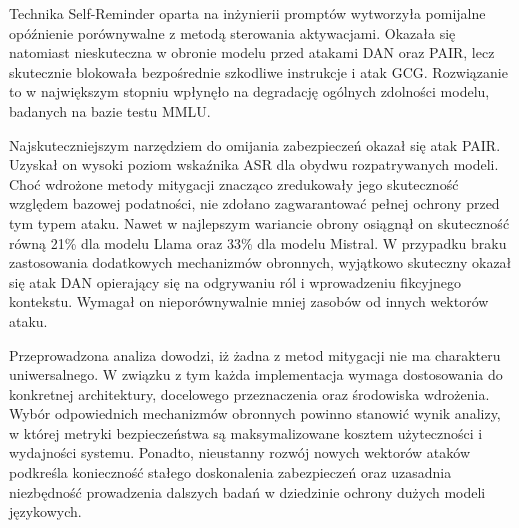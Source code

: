 Technika Self-Reminder oparta na inżynierii promptów wytworzyła pomijalne opóźnienie porównywalne z metodą sterowania aktywacjami. Okazała się natomiast nieskuteczna w obronie modelu przed atakami \gls{DAN} oraz \gls{PAIR}, lecz skutecznie blokowała bezpośrednie szkodliwe instrukcje i atak \gls{GCG}. Rozwiązanie to w największym stopniu wpłynęło na degradację ogólnych zdolności modelu, badanych na bazie testu MMLU.

Najskuteczniejszym narzędziem do omijania zabezpieczeń okazał się atak \gls{PAIR}. Uzyskał on wysoki poziom wskaźnika \gls{ASR} dla obydwu rozpatrywanych modeli. Choć wdrożone metody mitygacji znacząco zredukowały jego skuteczność względem bazowej podatności, nie zdołano zagwarantować pełnej ochrony przed tym typem ataku. Nawet w najlepszym wariancie obrony osiągnął on skuteczność równą 21\% dla modelu Llama oraz 33\% dla modelu Mistral. W przypadku braku zastosowania dodatkowych mechanizmów obronnych, wyjątkowo skuteczny okazał się atak \gls{DAN} opierający się na odgrywaniu ról i wprowadzeniu fikcyjnego kontekstu. Wymagał on nieporównywalnie mniej zasobów od innych wektorów ataku.

Przeprowadzona analiza dowodzi, iż żadna z metod mitygacji nie ma charakteru uniwersalnego. W związku z tym każda implementacja wymaga dostosowania do konkretnej architektury, docelowego przeznaczenia oraz środowiska wdrożenia. Wybór odpowiednich mechanizmów obronnych powinno stanowić wynik analizy, w której metryki bezpieczeństwa są maksymalizowane kosztem użyteczności i wydajności systemu. Ponadto, nieustanny rozwój nowych wektorów ataków podkreśla konieczność stałego doskonalenia zabezpieczeń oraz uzasadnia niezbędność prowadzenia dalszych badań w dziedzinie ochrony dużych modeli językowych.